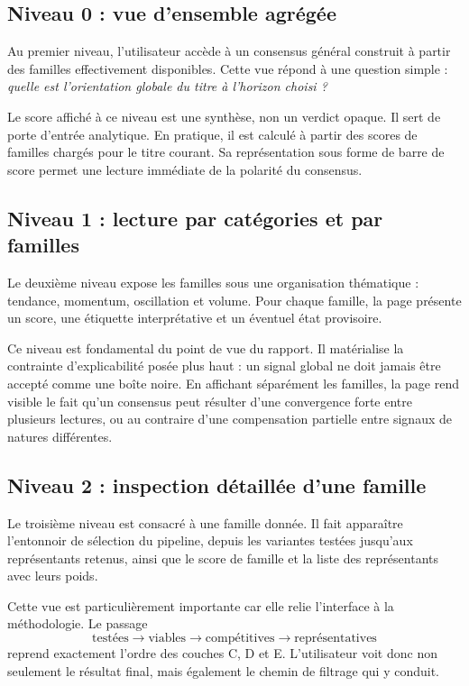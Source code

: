 \subsection{Niveau 0 : vue d'ensemble agrégée}
Au premier niveau, l'utilisateur accède à un consensus général construit à partir
des familles effectivement disponibles. Cette vue répond à une question simple :
\emph{quelle est l'orientation globale du titre à l'horizon choisi ?}

Le score affiché à ce niveau est une synthèse, non un verdict opaque. Il sert de
porte d'entrée analytique. En pratique, il est calculé à partir des scores de
familles chargés pour le titre courant. Sa représentation sous forme de barre de
score permet une lecture immédiate de la polarité du consensus.

\subsection{Niveau 1 : lecture par catégories et par familles}
Le deuxième niveau expose les familles sous une organisation thématique :
tendance, momentum, oscillation et volume. Pour chaque famille, la page présente
un score, une étiquette interprétative et un éventuel état provisoire.

Ce niveau est fondamental du point de vue du rapport. Il matérialise la
contrainte d'explicabilité posée plus haut : un signal global ne doit jamais être
accepté comme une boîte noire. En affichant séparément les familles, la page
rend visible le fait qu'un consensus peut résulter d'une convergence forte entre
plusieurs lectures, ou au contraire d'une compensation partielle entre signaux de
natures différentes.

\subsection{Niveau 2 : inspection détaillée d'une famille}
Le troisième niveau est consacré à une famille donnée. Il fait apparaître
l'entonnoir de sélection du pipeline, depuis les variantes testées jusqu'aux
représentants retenus, ainsi que le score de famille et la liste des
représentants avec leurs poids.

Cette vue est particulièrement importante car elle relie l'interface à la
méthodologie. Le passage
\[
\text{testées} \rightarrow \text{viables} \rightarrow \text{compétitives} \rightarrow \text{représentatives}
\]
reprend exactement l'ordre des couches C, D et E. L'utilisateur voit donc non
seulement le résultat final, mais également le chemin de filtrage qui y conduit.

